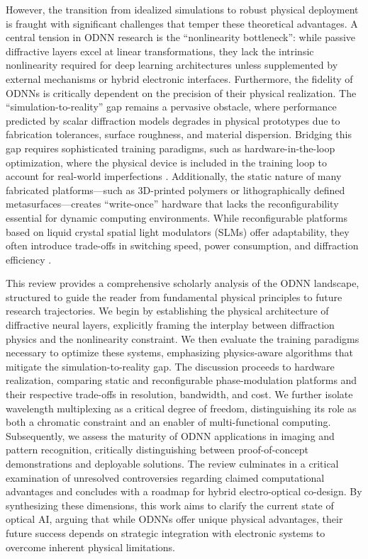 \documentclass[11pt]{article}
\begin{document}
However, the transition from idealized simulations to robust physical deployment is fraught with significant challenges that temper these theoretical advantages. A central tension in ODNN research is the ``nonlinearity bottleneck'': while passive diffractive layers excel at linear transformations, they lack the intrinsic nonlinearity required for deep learning architectures unless supplemented by external mechanisms or hybrid electronic interfaces. Furthermore, the fidelity of ODNNs is critically dependent on the precision of their physical realization. The ``simulation-to-reality'' gap remains a pervasive obstacle, where performance predicted by scalar diffraction models degrades in physical prototypes due to fabrication tolerances, surface roughness, and material dispersion. Bridging this gap requires sophisticated training paradigms, such as hardware-in-the-loop optimization, where the physical device is included in the training loop to account for real-world imperfections \citep{doi_10_1117_12_3013482_d44587c1}. Additionally, the static nature of many fabricated platforms---such as 3D-printed polymers or lithographically defined metasurfaces---creates ``write-once'' hardware that lacks the reconfigurability essential for dynamic computing environments. While reconfigurable platforms based on liquid crystal spatial light modulators (SLMs) offer adaptability, they often introduce trade-offs in switching speed, power consumption, and diffraction efficiency \citep{doi_10_1002_adom_202300561_c4d7a5b0}.

This review provides a comprehensive scholarly analysis of the ODNN landscape, structured to guide the reader from fundamental physical principles to future research trajectories. We begin by establishing the physical architecture of diffractive neural layers, explicitly framing the interplay between diffraction physics and the nonlinearity constraint. We then evaluate the training paradigms necessary to optimize these systems, emphasizing physics-aware algorithms that mitigate the simulation-to-reality gap. The discussion proceeds to hardware realization, comparing static and reconfigurable phase-modulation platforms and their respective trade-offs in resolution, bandwidth, and cost. We further isolate wavelength multiplexing as a critical degree of freedom, distinguishing its role as both a chromatic constraint and an enabler of multi-functional computing. Subsequently, we assess the maturity of ODNN applications in imaging and pattern recognition, critically distinguishing between proof-of-concept demonstrations and deployable solutions. The review culminates in a critical examination of unresolved controversies regarding claimed computational advantages and concludes with a roadmap for hybrid electro-optical co-design. By synthesizing these dimensions, this work aims to clarify the current state of optical AI, arguing that while ODNNs offer unique physical advantages, their future success depends on strategic integration with electronic systems to overcome inherent physical limitations.
\end{document}
